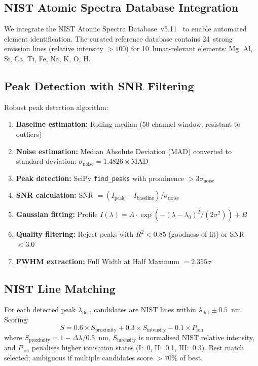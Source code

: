 \documentclass[a4paper,twocolumn,10pt]{article}
\begin{document}
\subsection{NIST Atomic Spectra Database Integration}

We integrate the NIST Atomic Spectra Database~v5.11~\cite{NIST} to
enable automated element identification. The curated reference database
contains 24~strong emission lines (relative intensity $>100$) for
10~lunar-relevant elements: Mg, Al, Si, Ca, Ti, Fe, Na, K, O, H.

\subsection{Peak Detection with SNR Filtering}

Robust peak detection algorithm:

\begin{enumerate}[nosep,leftmargin=*]
  \item \textbf{Baseline estimation:} Rolling median (50-channel window,
    resistant to outliers)
  \item \textbf{Noise estimation:} Median Absolute Deviation (MAD)
    converted to standard deviation: $\sigma_{\text{noise}} = 1.4826
    \times \text{MAD}$
  \item \textbf{Peak detection:} SciPy \texttt{find\_peaks} with
    prominence $> 3\sigma_{\text{noise}}$
  \item \textbf{SNR calculation:} SNR $= (I_{\text{peak}} -
    I_{\text{baseline}}) / \sigma_{\text{noise}}$
  \item \textbf{Gaussian fitting:} Profile
    $I(\lambda) = A \cdot \exp(-(\lambda - \lambda_0)^2 / (2\sigma^2)) + B$
  \item \textbf{Quality filtering:} Reject peaks with $R^2 < 0.85$
    (goodness of fit) or SNR $< 3.0$
  \item \textbf{FWHM extraction:} Full Width at Half Maximum $= 2.355\sigma$
\end{enumerate}

\subsection{NIST Line Matching}

For each detected peak $\lambda_{\text{det}}$, candidates are NIST lines
within $\lambda_{\text{det}} \pm 0.5$~nm. Scoring:
\begin{equation}
S = 0.6 \times S_{\text{proximity}} + 0.3 \times S_{\text{intensity}}
    - 0.1 \times P_{\text{ion}}
\end{equation}
where $S_{\text{proximity}} = 1 - \Delta\lambda / 0.5$~nm,
$S_{\text{intensity}}$ is normalised NIST relative intensity, and
$P_{\text{ion}}$ penalises higher ionisation states (I:~0, II:~0.1,
III:~0.3). Best match selected; ambiguous if multiple candidates
score $>70\%$ of best.
\end{document}
